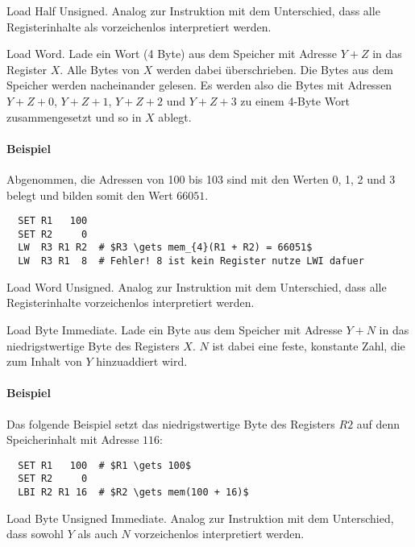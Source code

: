 \glqq Load Half Unsigned\grqq.
Analog zur Instruktion  mit dem Unterschied, dass alle Registerinhalte
als vorzeichenlos interpretiert werden.


\glqq Load Word\grqq.
Lade ein Wort (4 Byte) aus dem Speicher mit Adresse $Y + Z$ in das Register $X$.
Alle Bytes von $X$ werden dabei überschrieben.
Die Bytes aus dem Speicher werden nacheinander gelesen. Es werden also die
Bytes mit Adressen $Y + Z + 0$, $Y + Z + 1$, $Y + Z + 2$ und $Y + Z + 3$ zu
einem 4-Byte Wort zusammengesetzt und so in $X$ ablegt.

\paragraph{Beispiel}
Abgenommen, die Adressen von 100 bis 103 sind mit den Werten 0, 1, 2 und 3
belegt und bilden somit den Wert $66051$.
\begin{lstlisting}
  SET R1   100
  SET R2     0
  LW  R3 R1 R2  # $R3 \gets mem_{4}(R1 + R2) = 66051$
  LW  R3 R1  8  # Fehler! 8 ist kein Register nutze LWI dafuer
\end{lstlisting}


\glqq Load Word Unsigned\grqq.
Analog zur Instruktion  mit dem Unterschied, dass alle Registerinhalte
vorzeichenlos interpretiert werden.




\glqq Load Byte Immediate\grqq.
Lade ein Byte aus dem Speicher mit Adresse $Y + N$ in das niedrigstwertige Byte
des Registers $X$. $N$ ist dabei eine feste, konstante Zahl, die zum Inhalt von
$Y$ hinzuaddiert wird.

\paragraph{Beispiel}
Das folgende Beispiel setzt das niedrigstwertige Byte des Registers $R2$ auf
denn Speicherinhalt mit Adresse $116$:

\begin{lstlisting}
  SET R1   100  # $R1 \gets 100$
  SET R2     0
  LBI R2 R1 16  # $R2 \gets mem(100 + 16)$
\end{lstlisting}




\glqq Load Byte Unsigned Immediate\grqq.
Analog zur Instruktion  mit dem Unterschied, dass sowohl $Y$ als auch
$N$ vorzeichenlos interpretiert werden.



